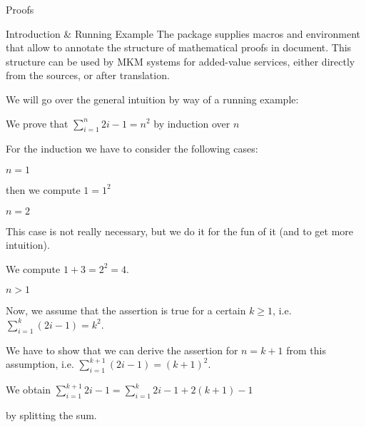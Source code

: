 \begin{sfragment}{Proofs}

\begin{sfragment}{Introduction \& Running Example}
  The  package supplies macros and environment that allow to annotate the
  structure of mathematical proofs in \sTeX document. This structure can be used by MKM
  systems for added-value services, either directly from the \sTeX sources, or after
  translation.

  We will go over the general intuition by way of a running example: 

\begin{latexcode}
\begin{sproof}[id=simple-proof]
   {We prove that $\sum_{i=1}^n{2i-1}=n^{2}$ by induction over $n$}
  \begin{spfcases}{For the induction we have to consider the following cases:}
   \begin{spfcase}{$n=1$}
    \begin{spfstep}[type=inline] then we compute $1=1^2$\end{spfstep}
   \end{spfcase}
   \begin{spfcase}{$n=2$}
      \begin{sproofcomment}[type=inline]
        This case is not really necessary, but we do it for the
        fun of it (and to get more intuition).
      \end{sproofcomment}
      \begin{spfstep}[type=inline] We compute $1+3=2^{2}=4$.\end{spfstep}
   \end{spfcase}
   \begin{spfcase}{$n>1$}
      \begin{spfstep}[type=assumption,id=ind-hyp]
        Now, we assume that the assertion is true for a certain $k\geq 1$,
        i.e. $\sum_{i=1}^k{(2i-1)}=k^{2}$.
      \end{spfstep}
      \begin{sproofcomment}
        We have to show that we can derive the assertion for $n=k+1$ from
        this assumption, i.e. $\sum_{i=1}^{k+1}{(2i-1)}=(k+1)^{2}$.
      \end{sproofcomment}
      \begin{spfstep}
        We obtain $\sum_{i=1}^{k+1}{2i-1}=\sum_{i=1}^k{2i-1}+2(k+1)-1$
        \begin{justification}[method=arith:split-sum]
          by splitting the sum.

\end{justification}
\end{spfstep}
\end{spfcase}
\end{spfcases}
\end{sproof}
\end{latexcode}
\end{sfragment}
\end{sfragment}
